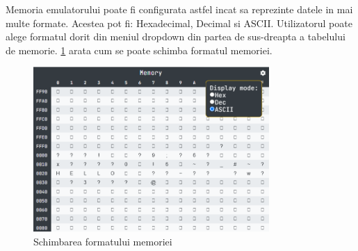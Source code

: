 \documentclass[titlepage,12pt]{article}
\begin{document}
Memoria emulatorului poate fi configurata astfel incat sa reprezinte datele in mai multe formate. Acestea pot fi: Hexadecimal, Decimal si ASCII. Utilizatorul poate alege formatul dorit din meniul dropdown din partea de sus-dreapta a tabelului de memorie. \cref{fig:memoryformat} arata cum se poate schimba formatul memoriei.


\begin{figure}[h!]
\centering
\includegraphics[width=0.8\textwidth]{images/memoryformat.png}
\caption{Schimbarea formatului memoriei}
\label{fig:memoryformat}
\end{figure}
\end{document}
